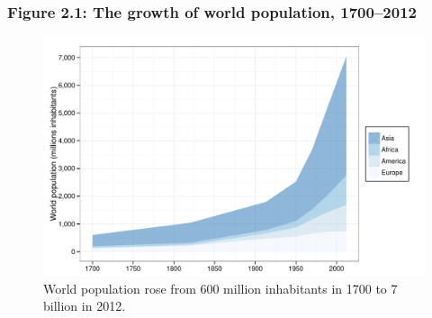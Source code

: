 \documentclass[t]{beamer}\usepackage[]{graphicx}\usepackage[]{color}
\newenvironment{knitrout}{}{} %
\begin{document}
\begin{frame}[label=Figure_2_1_b]
\frametitle{Figure 2.1: The growth of world population, 1700--2012}
\begin{figure}[t]
\begin{minipage}[b]{\textwidth}
\centering
\begin{knitrout}\footnotesize
{}\color{fgcolor}

{\centering \includegraphics[width=1\linewidth]{figures/color/Figure_2_1_b} 

}



\end{knitrout}
\caption{World population rose from 600 million inhabitants in 1700 to 7 billion in 2012.}
\end{minipage}
\end{figure}
\end{frame}
\end{document}
